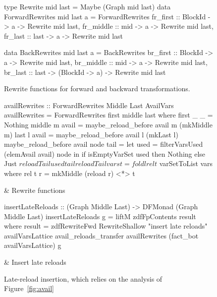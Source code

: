 \documentclass[blockstyle,preprint,nocopyrightspace]{sigplanconf}
\newcommand\seclabel[1]{\label{sec:#1}}
\newcommand\figref[1]{Figure~\ref{fig:#1}}
\newcommand\figlabel[1]{\label{fig:#1}}
\begin{document}
\seclabel{example-rewrites}

\begin{figure}
\begin{code}
type Rewrite mid last = Maybe (Graph mid last)
data ForwardRewrites mid last a = ForwardRewrites
 {fr_first  :: BlockId -> a -> Rewrite mid last,
  fr_middle :: mid     -> a -> Rewrite mid last,
  fr_last   :: last    -> a -> Rewrite mid last} 

data BackRewrites mid last a = BackRewrites
 {br_first  :: BlockId  -> a  -> Rewrite mid last,
  br_middle :: mid      -> a  -> Rewrite mid last,
  br_last   :: last ->
               (BlockId -> a) -> Rewrite mid last} 
\end{code}
\caption{Rewrite functions for forward and backward transformations.}
\figlabel{rewrites}
\end{figure}


\begin{figure*}
\begin{codetable}
\T\begin{code}
availRewrites :: ForwardRewrites Middle Last AvailVars
availRewrites = ForwardRewrites first middle last
  where first _ _ = Nothing
        middle m avail = maybe_reload_before avail m (mkMiddle m)
        last   l avail = maybe_reload_before avail l (mkLast l)
        maybe_reload_before avail node tail =
            let used = filterVarsUsed (elemAvail avail) node
            in  if isEmptyVarSet used then Nothing
                else Just $ reloadTail used tail
        reloadTail vars t = foldl rel t $ varSetToList vars
          where rel t r = mkMiddle (reload r) <*> t
\end{code}\B
& Rewrite \mbox{functions}\\
\hline

\T\begin{code}
insertLateReloads :: (Graph Middle Last) -> DFMonad (Graph Middle Last)
insertLateReloads g = liftM zdfFpContents result
  where result = zdfRewriteFwd RewriteShallow "insert late reloads"
                               availVarsLattice avail_reloads_transfer
                               availRewrites (fact_bot availVarsLattice) g
\end{code}%
& Insert late reloads\\
\end{codetable}
\caption{Late-reload insertion, which relies on the analysis of \figref{avail}}
\figlabel{avail-rewrites}
\end{figure*}
\end{document}
